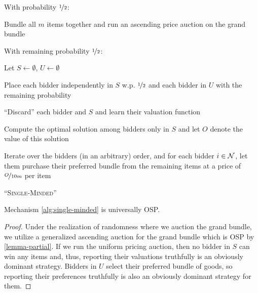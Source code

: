 \begin{algorithm2e}
 With probability $\nicefrac{1}{2}$: 

 \quad Bundle all $m$ items together and run an ascending price auction on the grand bundle

 With remaining probability $\nicefrac{1}{2}$:

 \quad Let $S \leftarrow \emptyset$, $U \leftarrow \emptyset$
 
 \quad Place each bidder independently in $S$ w.p. $\nicefrac{1}{2}$ and each bidder in $U$ with the remaining probability

 \quad ``Discard'' each bidder and $S$ and learn their valuation function

 \quad Compute the optimal solution among bidders only in $S$ and let $O$ denote the value of this solution


\quad  Iterate over the bidders (in an arbitrary) order, and for each bidder $i \in \mathcal{N}$, let them purchase their preferred bundle from the remaining items at a price of $\nicefrac{O}{10m}$ per item
 
 
 \caption{``\textsc{Single-Minded}''}
 \label{alg:single-minded}
\end{algorithm2e}


\begin{lemma}\label{claim-mua-sm-mechanism-osp}
    Mechanism \ref{alg:single-minded} is universally OSP.
\end{lemma}
\begin{proof}
Under the realization of randomness where we auction the grand bundle, we utilize a generalized ascending auction for the grand bundle which is OSP by \cref{lemma-partial}.  
If we run the uniform pricing auction, then no bidder in $S$ can win any items and, thus, reporting their valuations truthfully is an obviously dominant strategy. Bidders in $U$ select their preferred bundle of goods, so reporting their preferences truthfully is also an obviously dominant strategy for them.
\end{proof}


